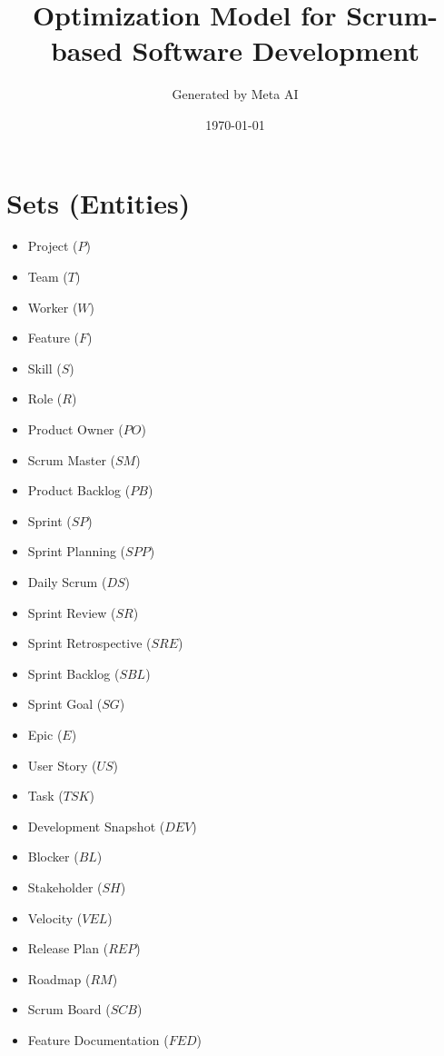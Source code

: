 \documentclass{article}
\title{Optimization Model for Scrum-based Software Development}
\author{Generated by Meta AI}
\date{\today}
\begin{document}
\maketitle
\tableofcontents

\section{Sets (Entities)}
\begin{itemize}
    \item Project ($P$)
    \item Team ($T$)
    \item Worker ($W$)
    \item Feature ($F$)
    \item Skill ($S$)
    \item Role ($R$)
    \item Product Owner ($PO$)
    \item Scrum Master ($SM$)
    \item Product Backlog ($PB$)
    \item Sprint ($SP$)
    \item Sprint Planning ($SPP$)
    \item Daily Scrum ($DS$)
    \item Sprint Review ($SR$)
    \item Sprint Retrospective ($SRE$)
    \item Sprint Backlog ($SBL$)
    \item Sprint Goal ($SG$)
    \item Epic ($E$)
    \item User Story ($US$)
    \item Task ($TSK$)
    \item Development Snapshot ($DEV$)
    \item Blocker ($BL$)
    \item Stakeholder ($SH$)
    \item Velocity ($VEL$)
    \item Release Plan ($REP$)
    \item Roadmap ($RM$)
    \item Scrum Board ($SCB$)
    \item Feature Documentation ($FED$)
\end{itemize}
\end{document}
